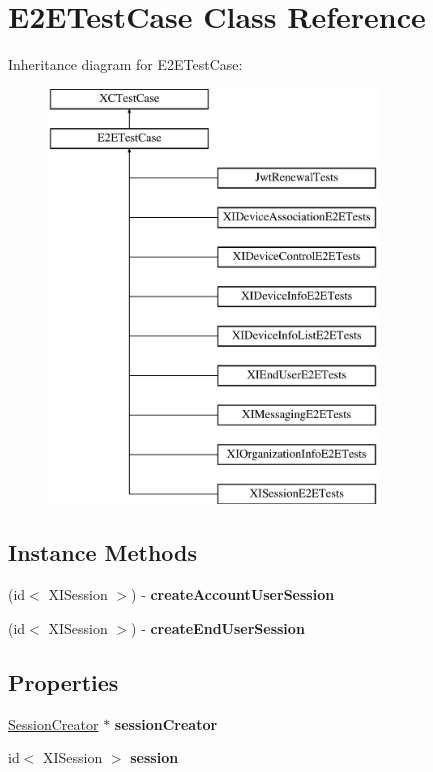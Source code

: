 \hypertarget{interface_e2_e_test_case}{}\section{E2\+E\+Test\+Case Class Reference}
\label{interface_e2_e_test_case}
Inheritance diagram for E2\+E\+Test\+Case\+:\begin{figure}[H]
\begin{center}
\leavevmode
\includegraphics[height=11.000000cm]{interface_e2_e_test_case}
\end{center}
\end{figure}
\subsection*{Instance Methods}
\begin{DoxyCompactItemize}
\item 
\hypertarget{interface_e2_e_test_case_aebe3d5ae1905b3920ffdab71bb9b3e00}{}\label{interface_e2_e_test_case_aebe3d5ae1905b3920ffdab71bb9b3e00} 
(id$<$ X\+I\+Session $>$) -\/ {\bfseries create\+Account\+User\+Session}
\item 
\hypertarget{interface_e2_e_test_case_a8c31414e288cd52ff377e516c6ca127f}{}\label{interface_e2_e_test_case_a8c31414e288cd52ff377e516c6ca127f} 
(id$<$ X\+I\+Session $>$) -\/ {\bfseries create\+End\+User\+Session}
\end{DoxyCompactItemize}
\subsection*{Properties}
\begin{DoxyCompactItemize}
\item 
\hypertarget{interface_e2_e_test_case_a3184207356d738cdd088641af5f2b9b6}{}\label{interface_e2_e_test_case_a3184207356d738cdd088641af5f2b9b6} 
\hyperlink{interface_session_creator}{Session\+Creator} $\ast$ {\bfseries session\+Creator}
\item 
\hypertarget{interface_e2_e_test_case_ac33bb3190024b6dc41d248c60fec455a}{}\label{interface_e2_e_test_case_ac33bb3190024b6dc41d248c60fec455a} 
id$<$ X\+I\+Session $>$ {\bfseries session}
\end{DoxyCompactItemize}


